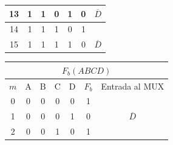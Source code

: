 \begin{center}
\begin{minipage}[t]{0.45\textwidth}
\begin{tabular}{ccccccc}
\multicolumn{1}{c|}{13}                          & 1                         & 1                         & 0                         & \multicolumn{1}{c|}{1}                         & \multicolumn{1}{c|}{0}                             & \multirow{-2}{*}{$\overline{D}$} \\ \hline
\multicolumn{1}{c|}{14}                          & 1                         & 1                         & 1                         & \multicolumn{1}{c|}{0}                         & \multicolumn{1}{c|}{1}                             &                                  \\
\multicolumn{1}{c|}{15}                          & 1                         & 1                         & 1                         & \multicolumn{1}{c|}{1}                         & \multicolumn{1}{c|}{0}                             & \multirow{-2}{*}{$\overline{D}$}
\end{tabular}
    \end{minipage}
    \begin{minipage}[t]{0.45\textwidth}\centering
\begin{tabular}{ccccccc}
\multicolumn{7}{c}{\cellcolor[HTML]{FFFFC7}$F_b(ABCD)$}                                                                                                                                                                                                                       \\ \hline
\multicolumn{1}{c|}{\cellcolor[HTML]{9AFF99}$m$} & \cellcolor[HTML]{ECF4FF}A & \cellcolor[HTML]{ECF4FF}B & \cellcolor[HTML]{ECF4FF}C & \multicolumn{1}{c|}{\cellcolor[HTML]{ECF4FF}D} & \multicolumn{1}{c|}{\cellcolor[HTML]{FFCCC9}$F_b$} & Entrada al MUX                   \\ \hline
\multicolumn{1}{c|}{0}                           & 0                         & 0                         & 0                         & \multicolumn{1}{c|}{0}                         & \multicolumn{1}{c|}{1}                             &                                  \\
\multicolumn{1}{c|}{1}                           & 0                         & 0                         & 0                         & \multicolumn{1}{c|}{1}                         & \multicolumn{1}{c|}{0}                             & \multirow{-2}{*}{$\overline{D}$} \\ \hline
\multicolumn{1}{c|}{2}                           & 0                         & 0                         & 1                         & \multicolumn{1}{c|}{0}                         & \multicolumn{1}{c|}{1}                             &                                  \\

\end{tabular}
\end{minipage}
\end{center}
